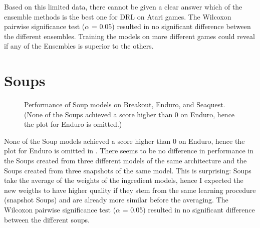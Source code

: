 Based on this limited data, there cannot be given a clear answer which of the ensemble methods is the best one for DRL on Atari games. The Wilcoxon pairwise significance test ($\alpha$ = 0.05) resulted in no significant difference between the different ensembles. Training the models on more different games could reveal if any of the Ensembles is superior to the others.


\section{Soups}
\begin{figure}[ht!]
    \centering

    \caption{Performance of Soup models on Breakout, Enduro, and Seaquest. (None of the Soups achieved a score higher than 0 on Enduro, hence the plot for Enduro is omitted.)}
    \label{fig:res:soups_only}
\end{figure}

None of the Soup models achieved a score higher than 0 on Enduro, hence the plot for Enduro is omitted in . There seems to be no difference in performance in the Soups created from three different models of the same architecture and the Soups created from three snapshots of the same model. This is surprising: Soups take the average of the weights of the ingredient models, hence I expected the new weigths to have higher quality if they stem from the same learning procedure (snapshot Soups) and are already more similar before the averaging. The Wilcoxon pairwise significance test ($\alpha$ = 0.05) resulted in no significant difference between the different soups.


